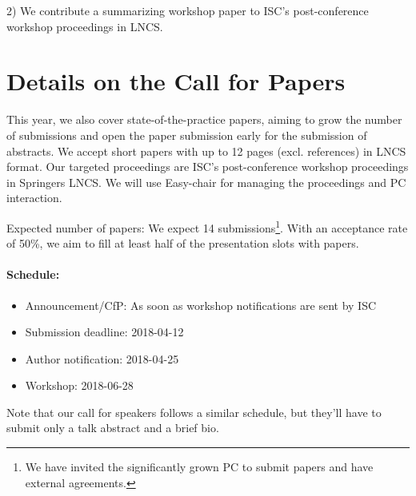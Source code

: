 \documentclass[a4paper,10pt]{article}
\begin{document}
2) We contribute a summarizing workshop paper to ISC's post-conference workshop proceedings in LNCS.

\section{Details on the Call for Papers}

This year, we also cover state-of-the-practice papers, aiming to grow the number of submissions and open the paper submission early for the submission of abstracts.
We accept short papers with up to 12 pages (excl. references) in LNCS format.
Our targeted proceedings are ISC's post-conference workshop proceedings in Springers LNCS.
We will use Easy-chair for managing the proceedings and PC interaction.

Expected number of papers: We expect 14 submissions\footnote{We have invited the significantly grown PC to submit papers and have external agreements.}.
With an acceptance rate of 50\%, we aim to fill at least half of the presentation slots with papers.

\paragraph{Schedule:}
\begin{itemize}
  \item Announcement/CfP: As soon as workshop notifications are sent by ISC
  \item Submission deadline: 2018-04-12
  \item Author notification: 2018-04-25
  \item Workshop: 2018-06-28
\end{itemize}
Note that our call for speakers follows a similar schedule, but they'll have to submit only a talk abstract and a brief bio.
\end{document}
